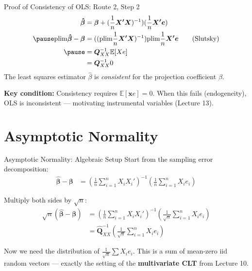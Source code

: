 \documentclass[aspectratio=169, handout, t]{beamer}
\numberwithin{equation}{section}
\begin{document}
\begin{frame}{Proof of Consistency of OLS: Route 2, Step 2}
\begin{align*}
\bm{\hat{\beta}}&=\bm{\beta}+(\frac{1}{n}\bm{X'X})^{-1}) ( \frac{1}{n}\bm{X'e}) \\ \pause
\text{plim}\bm{\hat{\beta}}-\bm{\beta}&=((\text{plim}\frac{1}{n}\bm{X'X})^{-1}) \text{plim} \frac{1}{n}\bm{X'e} \tag{Slutsky}\\ \pause
&=\bm{Q}_{XX}^{-1} \mathbb{E}[Xe]\\
&=\bm{Q}_{XX}^{-1} 0
\end{align*}
The least squares estimator $\hat{\beta}$ is \emph{consistent} for the projection coefficient $\beta$.

\pause

\begin{tcolorbox}[colback=blue!5, colframe=blue!50]
\textbf{Key condition:} Consistency requires $\mathbb{E}[\bm{x}e] = 0$. When this fails (endogeneity), OLS is inconsistent --- motivating instrumental variables (Lecture 13).
\end{tcolorbox}

 \end{frame}

\section{Asymptotic Normality}

\begin{frame}{Asymptotic Normality: Algebraic Setup}
Start from the sampling error decomposition:
\begin{align*}
\bm{\hat{\beta}} - \bm{\beta}
&= \left( \frac{1}{n} \sum_{i=1}^n X_i X_i' \right)^{-1}
    \left( \frac{1}{n} \sum_{i=1}^n X_i e_i \right)
    \tag{1}
\end{align*}

\pause

Multiply both sides by $\sqrt{n}$:
\begin{align*}
\sqrt{n}(\bm{\hat{\beta}} - \bm{\beta})
&= \left( \frac{1}{n} \sum_{i=1}^n X_i X_i' \right)^{-1}
    \left( \frac{1}{\sqrt{n}} \sum_{i=1}^n X_i e_i \right)
    \tag{2} \\
&= \bm{\hat{Q}}_{XX}^{-1}
    \left( \frac{1}{\sqrt{n}} \sum_{i=1}^n X_i e_i \right)
    \tag{3}
\end{align*}

\pause

Now we need the distribution of $\frac{1}{\sqrt{n}} \sum X_i e_i$. This is a sum of mean-zero iid random vectors --- exactly the setting of the \textbf{multivariate CLT} from Lecture 10.

\end{frame}
\end{document}
